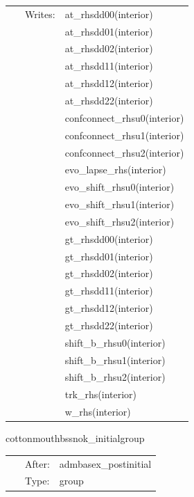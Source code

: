 \begin{tabular*}{160mm}{cll}
~ & Writes:  & at\_rhsdd00(interior) \\ 
~& ~ &at\_rhsdd01(interior)\\ 
~& ~ &at\_rhsdd02(interior)\\ 
~& ~ &at\_rhsdd11(interior)\\ 
~& ~ &at\_rhsdd12(interior)\\ 
~& ~ &at\_rhsdd22(interior)\\ 
~& ~ &confconnect\_rhsu0(interior)\\ 
~& ~ &confconnect\_rhsu1(interior)\\ 
~& ~ &confconnect\_rhsu2(interior)\\ 
~& ~ &evo\_lapse\_rhs(interior)\\ 
~& ~ &evo\_shift\_rhsu0(interior)\\ 
~& ~ &evo\_shift\_rhsu1(interior)\\ 
~& ~ &evo\_shift\_rhsu2(interior)\\ 
~& ~ &gt\_rhsdd00(interior)\\ 
~& ~ &gt\_rhsdd01(interior)\\ 
~& ~ &gt\_rhsdd02(interior)\\ 
~& ~ &gt\_rhsdd11(interior)\\ 
~& ~ &gt\_rhsdd12(interior)\\ 
~& ~ &gt\_rhsdd22(interior)\\ 
~& ~ &shift\_b\_rhsu0(interior)\\ 
~& ~ &shift\_b\_rhsu1(interior)\\ 
~& ~ &shift\_b\_rhsu2(interior)\\ 
~& ~ &trk\_rhs(interior)\\ 
~& ~ &w\_rhs(interior)\\ 
\end{tabular*} 


\vspace{5mm}


\hspace{5mm} cottonmouthbssnok\_initialgroup 

\hspace{5mm}{\it bssnok initialization routines } 


\hspace{5mm}

 \begin{tabular*}{160mm}{cll} 
~ & After:  & admbasex\_postinitial \\ 
~ & Type:  & group \\ 
\end{tabular*} 


